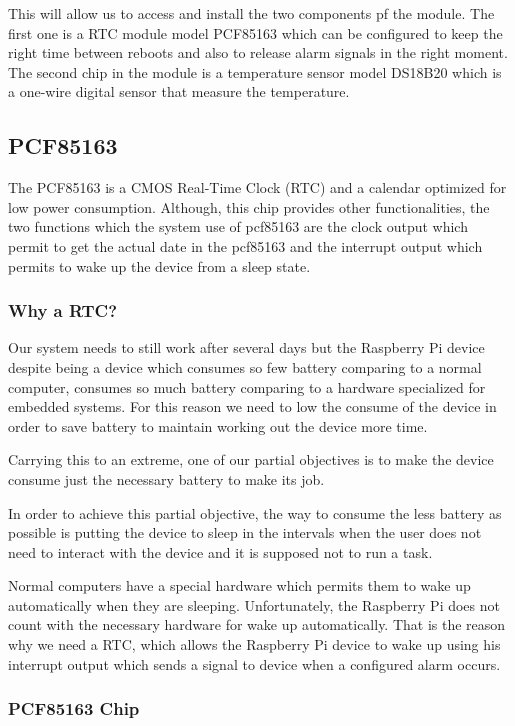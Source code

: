 		This will allow us to access and install the two components pf the module. The first one is a RTC module model PCF85163 which can be configured to keep the right time between reboots and also to release alarm signals in the right moment. The second chip in the module is a temperature sensor model DS18B20 which is a one-wire digital sensor that measure the temperature.
		
		\subsection{PCF85163}
		The PCF85163 is a CMOS Real-Time Clock (RTC) and a calendar optimized for low power consumption. Although, this chip provides other functionalities, the two functions which the system use of pcf85163 are the clock output which permit to get the actual date in the pcf85163 and the interrupt output which permits to wake up the device from a sleep state.

			\subsubsection{Why a RTC?}
			Our system needs to still work after several days but the Raspberry Pi device despite being a device which consumes so few battery comparing to a normal computer, consumes so much battery comparing to a hardware specialized for embedded systems. For this reason we need to low the consume of the device in order to save battery to maintain working out the device more time. 

			Carrying this to an extreme, one of our partial objectives is to make the device consume just the necessary battery to make its job.

			In order to achieve this partial objective, the way to consume the less battery as possible is putting the device to sleep in the intervals when the user does not need to interact with the device and it is supposed not to run a task.

			Normal computers have a special hardware which permits them to wake up automatically when they are sleeping. Unfortunately, the Raspberry Pi does not count with the necessary hardware for wake up automatically. That is the reason why we need a RTC, which allows the Raspberry Pi device to wake up using his interrupt output which sends a signal to device when a configured alarm occurs.

			\subsubsection{PCF85163 Chip} %

